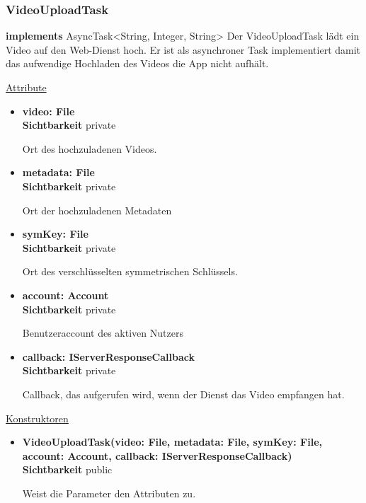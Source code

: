 \subsubsection{VideoUploadTask} \label{app:klasse:VideoUploadTask}
\textbf{implements} AsyncTask<String, Integer, String> \newline
Der VideoUploadTask lädt ein Video auf den Web-Dienst hoch. Er ist als asynchroner Task implementiert damit das aufwendige Hochladen des Videos die App nicht aufhält.\newline

\underline{Attribute}
\begin{itemize}
\itemsep0pt
\item \textbf{video: File} \hfill\\ 
\textbf{Sichtbarkeit} private

Ort des hochzuladenen Videos.

\item \textbf{metadata: File} \hfill\\ 
\textbf{Sichtbarkeit} private

Ort der hochzuladenen Metadaten

\item \textbf{symKey: File} \hfill\\ 
\textbf{Sichtbarkeit} private

Ort des verschlüsselten symmetrischen Schlüssels.

\item \textbf{account: Account} \hfill\\ 
\textbf{Sichtbarkeit} private

Benutzeraccount des aktiven Nutzers

\item \textbf{callback: IServerResponseCallback} \hfill\\ 
\textbf{Sichtbarkeit} private

Callback, das aufgerufen wird, wenn der Dienst das Video empfangen hat.
\end{itemize}

\underline{Konstruktoren}
\begin{itemize}
\itemsep0pt
\item \textbf{VideoUploadTask(video: File, metadata: File, symKey: File, account: Account, callback: IServerResponseCallback)} \hfill\\
\textbf{Sichtbarkeit} public

Weist die Parameter den Attributen zu.
\end{itemize}

